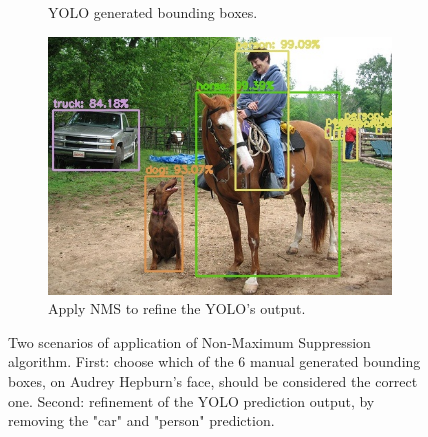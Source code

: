 \begin{figure}[!h]
\begin{subfigure}{.35\linewidth}
		\captionsetup{margin=0.3cm}
		\caption{YOLO generated bounding boxes.}
		\label{fig:sub_noNMS_yolo}
	\end{subfigure}
	\begin{subfigure}{.35\linewidth}
		\includegraphics[width=1\linewidth]{images/detection/ex2_yolo}
		\captionsetup{margin=0.3cm}
		\caption{Apply NMS to refine the YOLO's output.}
		\label{fig:sub_withNMS_yolo}
	\end{subfigure}
	\captionsetup{margin=0.5cm}
	\caption[Examples of application of NMS post-processing.]{Two scenarios of application of Non-Maximum Suppression algorithm. First: choose which of the 6 manual generated bounding boxes, on Audrey Hepburn's face, should be considered the correct one. Second: refinement of the YOLO prediction output, by removing the "car" and "person" prediction.}
	\label{fig:nms}
\end{figure}


